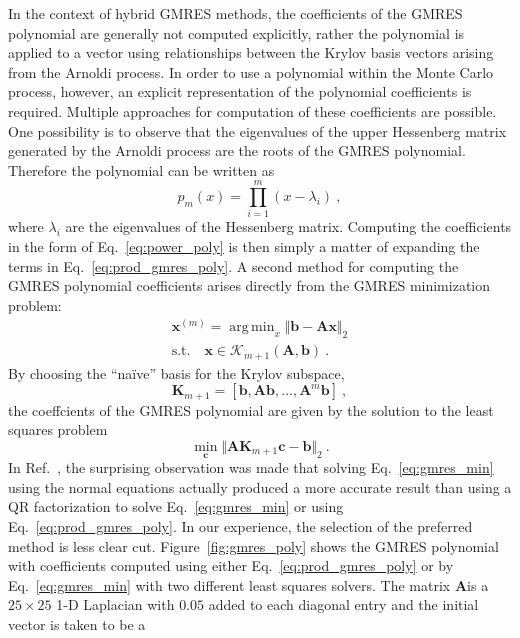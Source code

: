 \documentclass[10pt]{article}
\newcommand{\bx}{\ensuremath{\mathbf{x}}}
\newcommand{\bb}{\ensuremath{\mathbf{b}}}
\newcommand{\bc}{\ensuremath{\mathbf{c}}}
\newcommand{\bA}{\ensuremath{\mathbf{A}}}
\newcommand{\bK}{\ensuremath{\mathbf{K}}}
\newcommand{\calK}{\ensuremath{\mathcal{K}}}
\DeclareMathOperator*{\argmin}{arg\,min}
\begin{document}
In the context of hybrid GMRES methods, the coefficients of the GMRES polynomial
are generally not computed explicitly, rather the polynomial is applied
to a vector using relationships between the Krylov basis vectors arising from
the Arnoldi process.  In order to use a polynomial within the Monte Carlo
process, however, an explicit representation of the polynomial coefficients
is required.  Multiple approaches for computation of these coefficients
are possible.  One possibility is to observe that the eigenvalues of the
upper Hessenberg matrix generated by the Arnoldi process are the roots of the
GMRES polynomial.  Therefore the polynomial can be written as
\begin{equation}
p_m(x) = \prod_{i=1}^{m} (x - \lambda_i) \:, \label{eq:prod_gmres_poly}
\end{equation}
where $\lambda_i$ are the eigenvalues of the Hessenberg matrix.
Computing the coefficients in the form of Eq.~\eqref{eq:power_poly}
is then simply a matter of expanding the terms in Eq.~\eqref{eq:prod_gmres_poly}.
A second method for computing the GMRES polynomial coefficients arises
directly from the GMRES minimization problem:
\begin{align}
\bx^{(m)} = \argmin_x \Vert \bb - \bA \bx \Vert_2 \\
\text{s.t.} \quad \bx \in \calK_{m+1}(\bA,\bb) \:.
\end{align}
By choosing the ``na\"ive'' basis for the Krylov subspace,
\begin{equation}
\bK_{m+1} = \left[ \bb, \bA \bb, \ldots, \bA^m \bb \right] \:,
\end{equation}
the coeffcients of the GMRES polynomial are given by the solution to
the least squares problem
\begin{equation}
\min_{\bc} \Vert \bA \bK_{m+1} \bc - \bb \Vert_2 \:. \label{eq:gmres_min}
\end{equation}
In Ref.~\cite{liu_14}, the surprising observation was made that solving
Eq.~\eqref{eq:gmres_min} using the normal equations actually produced
a more accurate result than using a QR factorization to solve
Eq.~\eqref{eq:gmres_min} or using Eq.~\eqref{eq:prod_gmres_poly}.
In our experience, the selection of the preferred method is less clear
cut.  Figure~\ref{fig:gmres_poly} shows the GMRES polynomial with coefficients
computed using either Eq.~\eqref{eq:prod_gmres_poly} or by
Eq.~\eqref{eq:gmres_min} with two different least squares solvers.
The matrix \bA is a $25 \times 25$ 1-D Laplacian with $0.05$ added
to each diagonal entry and the initial vector is taken to be a
\end{document}
